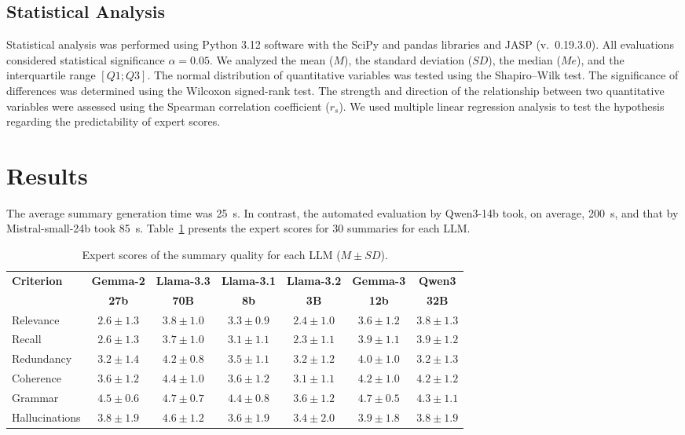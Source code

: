 \documentclass[runningheads]{llncs}
\begin{document}
\subsection{Statistical Analysis}\label{subsec:stats}

Statistical analysis was performed using Python 3.12 software with the SciPy and pandas libraries and JASP (v.~0.19.3.0). All evaluations considered statistical significance $\alpha = 0.05$. We analyzed the mean ($M$), the standard deviation ($SD$), the median ($Me$), and the interquartile range $[Q1; Q3]$. The normal distribution of quantitative variables was tested using the Shapiro--Wilk test. The significance of differences was determined using the Wilcoxon signed-rank test. The strength and direction of the relationship between two quantitative variables were assessed using the Spearman correlation coefficient ($r_s$). We used multiple linear regression analysis to test the hypothesis regarding the predictability of expert scores.

\section{Results}\label{sec:results}

The average summary generation time was 25~s. In contrast, the automated evaluation by Qwen3-14b took, on average, 200~s, and that by Mistral-small-24b took 85~s. Table~\ref{tab:expert} presents the expert scores for 30 summaries for each LLM.

\begin{table}[t]
\caption{Expert scores of the summary quality for each LLM ($M \pm SD$).}\label{tab:expert}
\centering
\small
\begin{tabular}{@{}lcccccc@{}}
\toprule
\textbf{Criterion} & \textbf{Gemma-2} & \textbf{Llama-3.3} & \textbf{Llama-3.1} & \textbf{Llama-3.2} & \textbf{Gemma-3} & \textbf{Qwen3} \\
 & \textbf{27b} & \textbf{70B} & \textbf{8b} & \textbf{3B} & \textbf{12b} & \textbf{32B} \\
\midrule
Relevance & $2.6 \pm 1.3$ & $3.8 \pm 1.0$ & $3.3 \pm 0.9$ & $2.4 \pm 1.0$ & $3.6 \pm 1.2$ & $3.8 \pm 1.3$ \\
Recall & $2.6 \pm 1.3$ & $3.7 \pm 1.0$ & $3.1 \pm 1.1$ & $2.3 \pm 1.1$ & $3.9 \pm 1.1$ & $3.9 \pm 1.2$ \\
Redundancy & $3.2 \pm 1.4$ & $4.2 \pm 0.8$ & $3.5 \pm 1.1$ & $3.2 \pm 1.2$ & $4.0 \pm 1.0$ & $3.2 \pm 1.3$ \\
Coherence & $3.6 \pm 1.2$ & $4.4 \pm 1.0$ & $3.6 \pm 1.2$ & $3.1 \pm 1.1$ & $4.2 \pm 1.0$ & $4.2 \pm 1.2$ \\
Grammar & $4.5 \pm 0.6$ & $4.7 \pm 0.7$ & $4.4 \pm 0.8$ & $3.6 \pm 1.2$ & $4.7 \pm 0.5$ & $4.3 \pm 1.1$ \\
Hallucinations & $3.8 \pm 1.9$ & $4.6 \pm 1.2$ & $3.6 \pm 1.9$ & $3.4 \pm 2.0$ & $3.9 \pm 1.8$ & $3.8 \pm 1.9$ \\
\bottomrule
\end{tabular}
\end{table}
\end{document}
